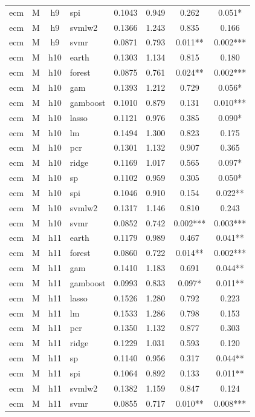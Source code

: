 \begin{ThreePartTable}
\begin{longtable}[t]{llclcccc}
ecm & M & h9 & spi & 0.1043 & 0.949 & 0.262 & 0.051*\\
ecm & M & h9 & svmlw2 & 0.1366 & 1.243 & 0.835 & 0.166\\
ecm & M & h9 & svmr & 0.0871 & 0.793 & 0.011** & 0.002***\\
\addlinespace
ecm & M & h10 & earth & 0.1303 & 1.134 & 0.815 & 0.180\\
ecm & M & h10 & forest & 0.0875 & 0.761 & 0.024** & 0.002***\\
ecm & M & h10 & gam & 0.1393 & 1.212 & 0.729 & 0.056*\\
ecm & M & h10 & gamboost & 0.1010 & 0.879 & 0.131 & 0.010***\\
ecm & M & h10 & lasso & 0.1121 & 0.976 & 0.385 & 0.090*\\
ecm & M & h10 & lm & 0.1494 & 1.300 & 0.823 & 0.175\\
ecm & M & h10 & pcr & 0.1301 & 1.132 & 0.907 & 0.365\\
ecm & M & h10 & ridge & 0.1169 & 1.017 & 0.565 & 0.097*\\
ecm & M & h10 & sp & 0.1102 & 0.959 & 0.305 & 0.050*\\
ecm & M & h10 & spi & 0.1046 & 0.910 & 0.154 & 0.022**\\
ecm & M & h10 & svmlw2 & 0.1317 & 1.146 & 0.810 & 0.243\\
ecm & M & h10 & svmr & 0.0852 & 0.742 & 0.002*** & 0.003***\\
\addlinespace
ecm & M & h11 & earth & 0.1179 & 0.989 & 0.467 & 0.041**\\
ecm & M & h11 & forest & 0.0860 & 0.722 & 0.014** & 0.002***\\
ecm & M & h11 & gam & 0.1410 & 1.183 & 0.691 & 0.044**\\
ecm & M & h11 & gamboost & 0.0993 & 0.833 & 0.097* & 0.011**\\
ecm & M & h11 & lasso & 0.1526 & 1.280 & 0.792 & 0.223\\
ecm & M & h11 & lm & 0.1533 & 1.286 & 0.798 & 0.153\\
ecm & M & h11 & pcr & 0.1350 & 1.132 & 0.877 & 0.303\\
ecm & M & h11 & ridge & 0.1229 & 1.031 & 0.593 & 0.120\\
ecm & M & h11 & sp & 0.1140 & 0.956 & 0.317 & 0.044**\\
ecm & M & h11 & spi & 0.1064 & 0.892 & 0.133 & 0.011**\\
ecm & M & h11 & svmlw2 & 0.1382 & 1.159 & 0.847 & 0.124\\
ecm & M & h11 & svmr & 0.0855 & 0.717 & 0.010** & 0.008***\\

\end{longtable}
\end{ThreePartTable}
